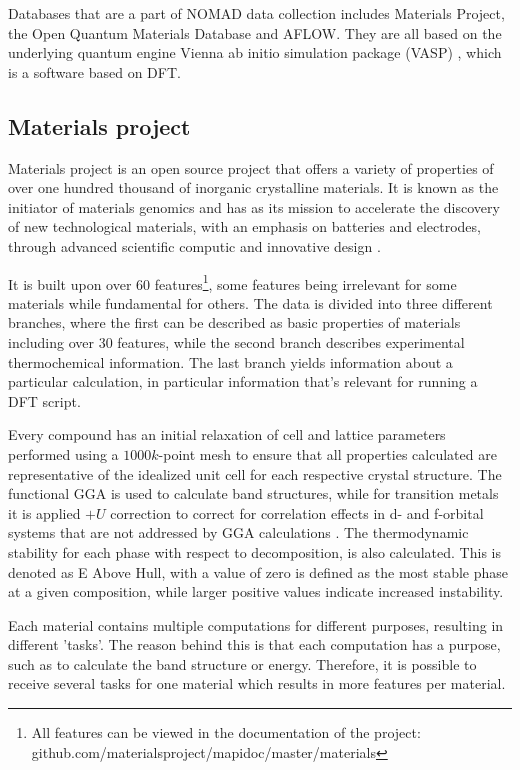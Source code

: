 Databases that are a part of NOMAD data collection includes Materials Project, the Open Quantum Materials Database and AFLOW. They are all based on the underlying quantum engine Vienna ab initio simulation package (VASP) \cite{Kresse1996}, which is a software based on DFT.

\subsection{Materials project}

Materials project is an open source project that offers a variety of properties of over one hundred thousand of inorganic crystalline materials. It is known as the initiator of materials genomics and has as its mission to accelerate the discovery of new technological materials, with an emphasis on batteries and electrodes, through advanced scientific computic and innovative design \cite{Jain2013}.

It is built upon over 60 features\footnote{All features can be viewed in the documentation of the project: github.com/materialsproject/mapidoc/master/materials}, some features being irrelevant for some materials while fundamental for others. The data is divided into three different branches, where the first can be described as basic properties of materials including over $30$ features, while the second branch describes experimental thermochemical information. The last branch yields information about a particular calculation, in particular information that's relevant for running a DFT script. %

Every compound has an initial relaxation of cell and lattice parameters performed using a $1000 k$-point mesh to ensure that all properties calculated are representative of the idealized unit cell for each respective crystal structure.
The functional GGA is used to calculate band structures, while for transition metals it is applied $+U$ correction to correct for correlation effects in d- and f-orbital systems that are not addressed by GGA calculations \cite{Wang2006}. The thermodynamic stability for each phase with respect to decomposition, is also calculated. This is denoted as E Above Hull, with a value of zero is defined as the most stable phase at a given composition, while larger positive values indicate increased instability.

Each material contains multiple computations for different purposes, resulting in different 'tasks'. The reason behind this is that each computation has a purpose, such as to calculate the band structure or energy. Therefore, it is possible to receive several tasks for one material which results in more features per material.


